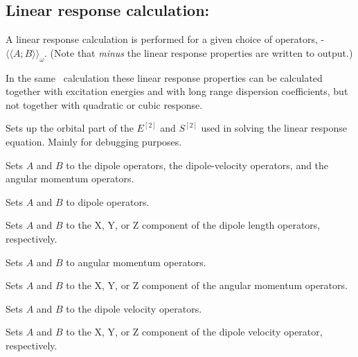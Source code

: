 \subsection{Linear response calculation: }
\label{sec:linearrsp}

A linear response
\cite{jodlypjjcp91,pjhjajjojcp89} calculation is performed for a given
choice of operators,
-$\langle\!\langle A; B \rangle\!\rangle_{\omega}$.
(Note that {\em minus} the linear response properties are written to output.)

In the same \resp\ calculation these linear response properties can be calculated
together with excitation energies
and with long range dispersion coefficients, but not 
together with quadratic or cubic response.

\begin{description}

\item{} Sets up the orbital part of the $E^{\left[2\right]}$
  and $S^{\left[2\right]}$ used in solving the linear response
  equation. Mainly for debugging purposes.

\item{}
Sets $A$ and $B$ to the dipole operators,
the dipole-velocity operators,
and the angular momentum operators.

\item{}
Sets $A$ and $B$ to dipole operators.

\item{}
Sets $A$ and $B$ to the X, Y, or Z component of the dipole length operators, respectively.

\item{}
Sets $A$ and $B$ to angular momentum operators.

\item{}
Sets $A$ and $B$ to the X, Y, or Z component of the angular momentum operators.

\item{}
Sets $A$ and $B$ to the dipole velocity operators.

\item{}
Sets $A$ and $B$ to the X, Y, or Z component of the dipole velocity
operator, respectively.


\end{description}
